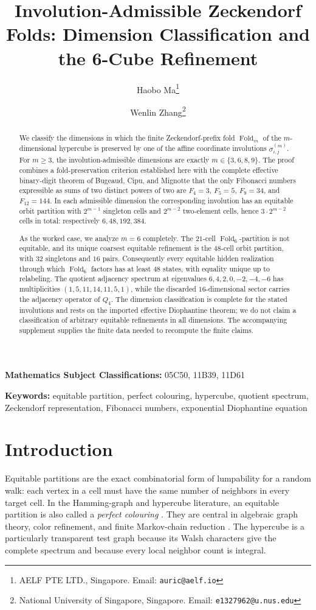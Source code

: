 \documentclass[12pt,a4paper]{article}
\title{Involution-Admissible Zeckendorf Folds: Dimension Classification and the
6-Cube Refinement}
\author{Haobo Ma\thanks{AELF PTE LTD., Singapore. Email: \texttt{auric@aelf.io}}
  \and Wenlin Zhang\thanks{National University of Singapore, Singapore. Email: \texttt{e1327962@u.nus.edu}}
}
\date{}
\theoremstyle{plain}
\theoremstyle{definition}
\numberwithin{equation}{section}
\newcommand{\Fold}{\operatorname{Fold}}
\begin{document}
\maketitle

\begin{abstract}
We classify the dimensions in which the finite Zeckendorf-prefix fold \(\Fold_m\) of the
\(m\)-dimensional hypercube is preserved by one of the affine coordinate involutions
\(\sigma_{i,j}^{(m)}\).  For \(m\ge3\), the involution-admissible dimensions are exactly
\(m\in\{3,6,8,9\}\).  The proof combines a fold-preservation criterion established here
with the complete effective binary-digit theorem of Bugeaud, Cipu, and Mignotte that the
only Fibonacci numbers expressible as sums of two distinct powers of two are
\(F_4=3\), \(F_5=5\), \(F_9=34\), and \(F_{12}=144\).  In each admissible dimension the
corresponding involution has an equitable orbit partition with \(2^{m-1}\) singleton cells
and \(2^{m-2}\) two-element cells, hence \(3\cdot2^{m-2}\) cells in total: respectively
\(6,48,192,384\).

As the worked case, we analyze \(m=6\) completely.  The \(21\)-cell \(\Fold_6\)-partition
is not equitable, and its unique coarsest equitable refinement is the \(48\)-cell orbit
partition, with \(32\) singletons and \(16\) pairs.  Consequently every equitable hidden
realization through which \(\Fold_6\) factors has at least \(48\) states, with equality
unique up to relabeling.  The quotient adjacency spectrum at eigenvalues
\(6,4,2,0,-2,-4,-6\) has multiplicities \((1,5,11,14,11,5,1)\), while the discarded
\(16\)-dimensional sector carries the adjacency operator of \(Q_4\).  The dimension
classification is complete for the stated involutions and rests on the imported effective
Diophantine theorem; we do not claim a classification of arbitrary equitable refinements
in all dimensions.  The accompanying supplement supplies the finite data needed to
recompute the finite claims.
\end{abstract}

\noindent\textbf{Mathematics Subject Classifications:} 05C50, 11B39, 11D61

\noindent\textbf{Keywords:} equitable partition, perfect colouring, hypercube,
quotient spectrum, Zeckendorf representation, Fibonacci numbers, exponential Diophantine equation

\section{Introduction}\label{sec:introduction}
Equitable partitions are the exact combinatorial form of lumpability for a random walk:
each vertex in a cell must have the same number of neighbors in every target cell.
In the Hamming-graph and hypercube literature, an equitable partition is also called a
\emph{perfect colouring} \cite{fonderflaass2007perfect,vasileva2019local}.
They are central in algebraic graph theory, color refinement, and finite Markov-chain
reduction \cite{biggs1993algebraic,kemeny1976finite,buchholz1994exact,krebs2015universal}.
The hypercube is a particularly transparent test graph because its Walsh characters give
the complete spectrum and because every local neighbor count is integral.
\end{document}
